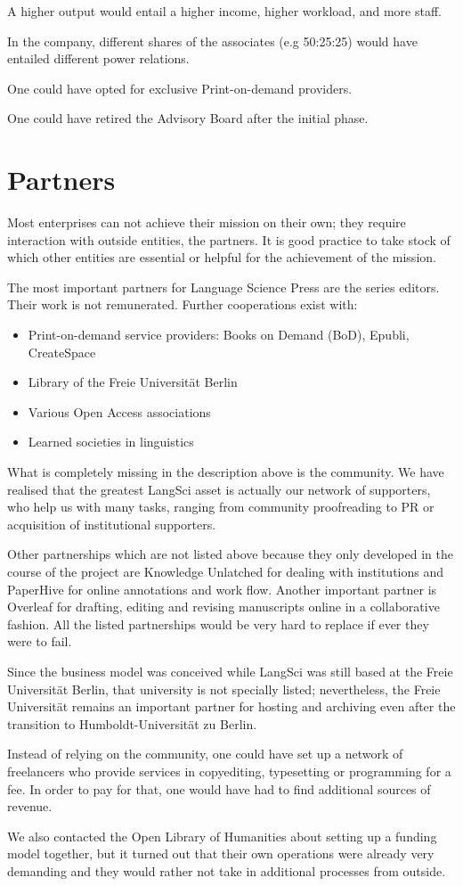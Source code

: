 \documentclass[nonflat,smallfont
]{langsci/langscibook}
\newcommand{\background}[1]{ 
  \vspace{5mm}
  \renewcommand{\tblslinecolour}{lsDarkBlue}
  \tblssy[red]{explore2}{Background}{\vspace*{-5mm}#1}
}
\newcommand{\langscisolution}[1]{
  \renewcommand{\tblslinecolour}{lsLightBlue}
  \tblssy{langsci}{LangSci solution}{\vspace*{-5mm}#1}
}
\newcommand{\evaluation}[1]{
  \renewcommand{\tblslinecolour}{lsLightOrange}
  \tblssy{receipt}{Evaluation}{\vspace*{-5mm}#1}
}
\newcommand{\othersolutions}[1]{
  \renewcommand{\tblslinecolour}{lsDarkGreenOne}
  \tblssy{more}{Other solutions}{\vspace*{-5mm}#1}
}
\renewcommand{\tblssy}[4][black!12]{%
  \renewcommand{\langscisymbol}{#2}\renewcommand{\tblsboxcolor}{#1}
  \begin{mdframed}[style=yellowexercise,frametitle={#3}]
    #4
  \end{mdframed}
}
\begin{document}
\othersolutions{A higher output would entail a higher income, higher workload, and more staff. 

In the company, different shares of the associates (e.g 50:25:25) would have entailed different power relations.

One could have opted for exclusive Print-on-demand providers. 

One could have retired the Advisory Board after the initial phase. 
\todo[inline]{advisory board v Advisory Board (check in whole doc)}
}
 
\section{Partners}
\vspace*{5mm}
\background{Most enterprises can not achieve their mission on their own; they require interaction with outside entities, the partners. It is good practice to take stock of which other entities are essential or helpful for the achievement of the mission.}
\langscisolution{
The most important partners for Language Science Press are the series editors. Their work is not remunerated. Further cooperations exist with:
\begin{itemize}
 \item Print-on-demand service providers: Books on Demand (BoD), Epubli, CreateSpace 
 \item Library of the Freie Universität Berlin
 \item Various Open Access associations 
 \item Learned societies in linguistics
\end{itemize}
}
\evaluation{
What is completely missing in the description above is the community. We have realised that the greatest LangSci asset is actually our network of supporters, who help us with many tasks, ranging from community proofreading to PR or acquisition of institutional supporters. 

Other partnerships which are not listed above because they only developed in the course of the project are Knowledge Unlatched for dealing with institutions and PaperHive for online annotations and work flow. Another important partner is Overleaf for drafting, editing and revising manuscripts online in a collaborative fashion. All the listed partnerships would be very hard to replace if ever they were to fail.

Since the business model was conceived while LangSci was still based at the Freie Universität Berlin, that university is not specially listed; nevertheless, the Freie Universität remains an important partner for hosting and archiving even after the transition to Humboldt-Universität zu Berlin.
}
\othersolutions{ 
Instead of relying on the community, one could have set up a network of freelancers who provide services in copyediting, typesetting or programming for a fee. In order to pay for that, one would have had to find additional sources of revenue. 

We also contacted the Open Library of Humanities about setting up a funding model together, but it turned out that their own operations were already very demanding and they would rather not take in additional processes from outside. 
}
 
\end{document}
